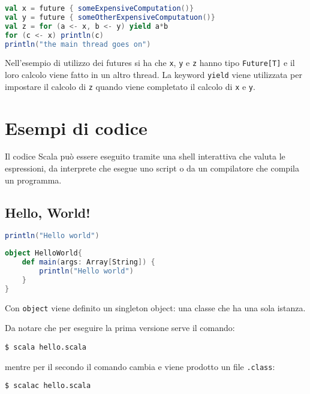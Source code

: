 \begin{lstlisting}[language=Scala]
val x = future { someExpensiveComputation()}
val y = future { someOtherExpensiveComputatuon()}
val z = for (a <- x, b <- y) yield a*b
for (c <- x) println(c)
println("the main thread goes on")
\end{lstlisting}

Nell'esempio di utilizzo dei futures si ha che \texttt{x}, \texttt{y} e \texttt{z} hanno tipo \texttt{Future[T]} e il loro calcolo viene fatto in un altro thread. La keyword \texttt{yield} viene utilizzata per impostare il calcolo di \texttt{z} quando viene completato il calcolo di \texttt{x} e \texttt{y}.


\section{Esempi di codice}

Il codice Scala può essere eseguito tramite una shell interattiva che valuta le espressioni, da interprete che esegue uno script o da un compilatore che compila un programma.

\subsection{Hello, World!}

\begin{lstlisting}[language=Scala, caption=Hello world come script.]
println("Hello world")
\end{lstlisting}

\begin{lstlisting}[language=Scala, caption=Hello world come programma]
object HelloWorld{
	def main(args: Array[String]) {
		println("Hello world")
	}
}
\end{lstlisting}

Con \texttt{object} viene definito un singleton object: una classe che ha una sola istanza.

Da notare che per eseguire la prima versione serve il comando:

\begin{center}
	\texttt{\$ scala hello.scala}
\end{center}

mentre per il secondo il comando cambia e viene prodotto un file \texttt{.class}:

\begin{center}
	\texttt{\$ scalac hello.scala}
\end{center}


